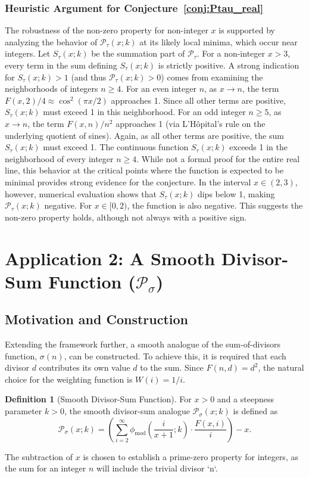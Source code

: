 \documentclass[11pt,a4paper]{amsart}
\newcommand{\Px}{\mathcal{P}}
\theoremstyle{plain}
\theoremstyle{definition}
\newtheorem{definition}[theorem]{Definition}
\begin{document}
\subsubsection*{Heuristic Argument for Conjecture~\ref{conj:Ptau_real}}
The robustness of the non-zero property for non-integer $x$ is supported by analyzing the behavior of $\Px_{\tau}(x; k)$ at its likely local minima, which occur near integers.
Let $S_{\tau}(x;k)$ be the summation part of $\Px_{\tau}$.
For a non-integer $x > 3$, every term in the sum defining $S_{\tau}(x;k)$ is strictly positive.
A strong indication for $S_{\tau}(x;k) > 1$ (and thus $\Px_{\tau}(x;k) > 0$) comes from examining the neighborhoods of integers $n \ge 4$.
For an even integer $n$, as $x \to n$, the term $F(x,2)/4 \approx \cos^2(\pi x/2)$ approaches 1. Since all other terms are positive, $S_{\tau}(x;k)$ must exceed 1 in this neighborhood.
For an odd integer $n \ge 5$, as $x \to n$, the term $F(x,n)/n^2$ approaches 1 (via L'Hôpital's rule on the underlying quotient of sines).
Again, as all other terms are positive, the sum $S_{\tau}(x;k)$ must exceed 1.
The continuous function $S_{\tau}(x;k)$ exceeds 1 in the neighborhood of every integer $n \ge 4$.
While not a formal proof for the entire real line, this behavior at the critical points where the function is expected to be minimal provides strong evidence for the conjecture.
In the interval $x \in (2,3)$, however, numerical evaluation shows that $S_{\tau}(x;k)$ dips below 1, making $\Px_{\tau}(x;k)$ negative.
For $x \in [0,2)$, the function is also negative. This suggests the non-zero property holds, although not always with a positive sign.
\section{Application 2: A Smooth Divisor-Sum Function (\texorpdfstring{$\Px_{\sigma}$}{P_sigma})}

\subsection{Motivation and Construction}
Extending the framework further, a smooth analogue of the sum-of-divisors function, $\sigma(n)$, can be constructed.
To achieve this, it is required that each divisor $d$ contributes its own value $d$ to the sum.
Since $F(n,d)=d^2$, the natural choice for the weighting function is $W(i)=1/i$.
\begin{definition}[Smooth Divisor-Sum Function]
For $x>0$ and a steepness parameter $k>0$, the smooth divisor-sum analogue $\Px_{\sigma}(x; k)$ is defined as
\begin{equation}\label{eq:Psigma}
\Px_{\sigma}(x; k) = \left( \sum_{i=2}^{\infty} \phi_{\text{mod}}\left(\frac{i}{x+1}; k\right) \cdot \frac{F(x,i)}{i} \right) - x.
\end{equation}
\end{definition}
The subtraction of $x$ is chosen to establish a prime-zero property for integers, as the sum for an integer $n$ will include the trivial divisor `n`.
\end{document}
